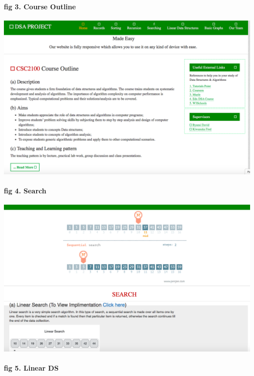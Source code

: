 \documentclass{article}
\begin{document}
\paragraph{fig 3. Course Outline}

\includegraphics[width=1.0\textwidth]{./csoutline}\\[0.1in]

\paragraph{fig 4. Search}

\includegraphics[width=1.0\textwidth]{./search}\\[0.1in]

\paragraph{fig 5. Linear DS}
\end{document}

